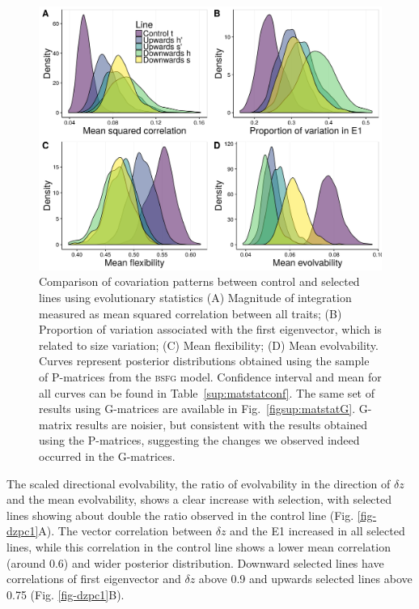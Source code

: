 \begin{refsection}
\begin{figure}     
	\centering
	\includegraphics[width=\linewidth]{chapter_ratones/media/figure3.png}
	\caption[Evolutionary statistics in selected and control lines]{     Comparison
of covariation patterns between control and selected lines using evolutionary
statistics (A) Magnitude of integration measured as mean squared correlation
between all traits; (B) Proportion of variation associated with the first
eigenvector, which is related to size variation; (C) Mean flexibility; (D) Mean
evolvability. Curves represent posterior distributions obtained using the sample
of P-matrices from the \textsc{bsfg} model. Confidence interval and mean for all curves
can be found in Table~\ref{sup:matstatconf}. The same set of results using G-matrices are available
in Fig.~\ref{figsup:matstatG}. G-matrix results are noisier, but consistent with the results
obtained using the P-matrices, suggesting the changes we observed indeed
occurred in the G-matrices.}     
	\label{fig-stats} 
\end{figure}

The scaled directional evolvability, the ratio of evolvability in the
direction of \(\delta z\) and the mean evolvability, shows a clear
increase with selection, with selected lines showing about double the
ratio observed in the control line (Fig. \ref{fig-dzpc1}A). The vector
correlation between \(\delta z\) and the E1 increased in all selected
lines, while this correlation in the control line shows a lower mean
correlation (around 0.6) and wider posterior distribution. Downward
selected lines have correlations of first eigenvector and \(\delta z\)
above 0.9 and upwards selected lines above 0.75 (Fig. \ref{fig-dzpc1}B).


\end{refsection}
